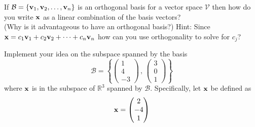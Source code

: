 \begin{problem}
    If $\mathcal{B} = \{{\bf v}_1, {\bf v}_2, \ldots, {\bf v}_n\}$ is an orthogonal basis for a vector
    space $\mathcal{V}$ then how do you write ${\bf x}$ as a linear combination of the basis vectors?\\
    (Why is it advantageous to have an orthogonal basis?) 
    Hint: Since ${\bf x} = c_1 {\bf v}_1 + c_2 {\bf v}_2 + \cdots + c_n {\bf v}_n$ how can you use
    orthogonality to solve for $c_j$?
\end{problem}

\begin{problem}
    Implement your idea on the subspace spanned by the basis
    \[ \mathcal{B} = \left\{ \begin{pmatrix} 1\\4\\-3 \end{pmatrix}\, , \, \begin{pmatrix}
            3 \\ 0 \\ 1 \end{pmatrix} \right\} \]
    where ${\bf x}$ is in the subspace of $\mathbb{R}^3$ spanned by $\mathcal{B}$.
    Specifically, let ${\bf x}$ be defined as
    \[ {\bf x} = \begin{pmatrix} 2 \\ -4\\ 1 \end{pmatrix} \]
\end{problem}

